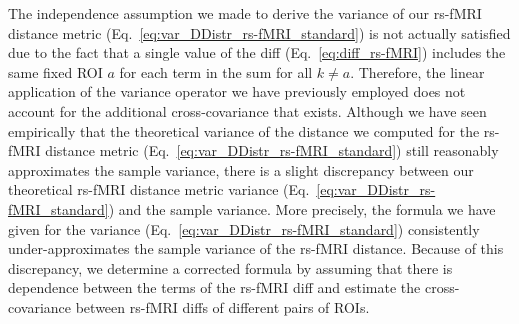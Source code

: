 \documentclass[aoas]{imsart}
\begin{document}
The independence assumption we made to derive the variance of our rs-fMRI distance metric (Eq.~\ref{eq:var_DDistr_rs-fMRI_standard}) is not actually satisfied due to the fact that a single value of the diff (Eq.~\ref{eq:diff_rs-fMRI}) includes the same fixed ROI $a$ for each term in the sum for all $k \neq a$. Therefore, the linear application of the variance operator we have previously employed does not account for the additional cross-covariance that exists. Although we have seen empirically that the theoretical variance of the distance we computed for the rs-fMRI distance metric (Eq.~\ref{eq:var_DDistr_rs-fMRI_standard}) still reasonably approximates the sample variance, there is a slight discrepancy between our theoretical rs-fMRI distance metric variance (Eq.~\ref{eq:var_DDistr_rs-fMRI_standard}) and the sample variance. More precisely, the formula we have given for the variance (Eq.~\ref{eq:var_DDistr_rs-fMRI_standard}) consistently under-approximates the sample variance of the rs-fMRI distance. Because of this discrepancy, we determine a corrected formula by assuming that there is dependence between the terms of the rs-fMRI diff and estimate the cross-covariance between rs-fMRI diffs of different pairs of ROIs. 
\end{document}

